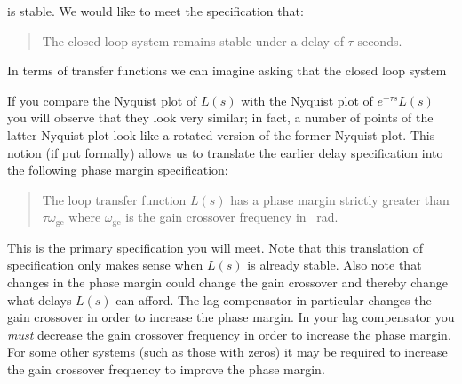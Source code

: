 %
is stable.
We would like to meet the specification that:
\begin{quote}
  The closed loop system remains stable under a delay of \(\tau\) seconds.
\end{quote}
In terms of transfer functions we can imagine asking that the closed loop system 
%
\begin{center}
\end{center}
%
If you compare the Nyquist plot of \(L(s)\) with the Nyquist plot of \(e^{-\tau s} L(s)\) you will observe that they look very similar;
in fact, a number of points of the latter Nyquist plot look like a rotated version of the former Nyquist plot.
This notion (if put formally) allows us to translate the earlier delay specification into the following phase margin specification: 
\begin{quote}
  The loop transfer function \(L(s)\) has a phase margin strictly greater than \(\tau \omega_{\mathrm{gc}}\) where \(\omega_{\mathrm{gc}}\) is the gain crossover frequency in \SI{}{\radian}.
\end{quote}
This is the primary specification you will meet.
Note that this translation of specification only makes sense when \(L(s)\) is already stable.
Also note that changes in the phase margin could change the gain crossover and thereby change what delays \(L(s)\) can afford.
The lag compensator in particular changes the gain crossover in order to increase the phase margin.
In your lag compensator you \emph{must} decrease the gain crossover frequency in order to increase the phase margin.
For some other systems (such as those with zeros) it may be required to increase the gain crossover frequency to improve the phase margin.

